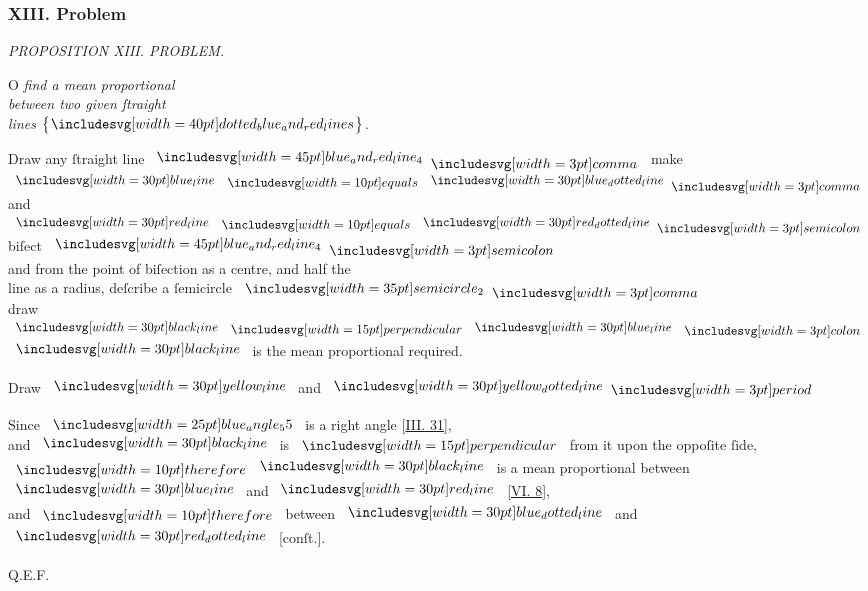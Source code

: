 \documentclass[11pt,preview]{standalone}
\begin{document}
\subsubsection{XIII. Problem}

\begin{minipage}[t]{0.54\textwidth}
    \begin{center}
        \textit{PROPOSITION XIII. PROBLEM.}\label{book6pr13} \\
    \end{center}

    \hfill

    \begin{center}
        \raggedright \lettrine[lines=3, loversize=1, nindent=0pt]{}{}O \textit{find a mean proportional\\ between two given ſtraight\\ lines} $\left\{\hspace{-1ex}\img[0][0][40]{dotted_blue_and_red_lines}\hspace{-1ex}\right\}$.
    \end{center}
\end{minipage}%
\hfill
\begin{minipage}[t]{0.43\textwidth}
    \vspace{20pt}
    
\end{minipage}%

\hfill

\hfill

\begin{center}
    Draw any ſtraight line $\bimg{blue_and_red_line_4} \bcomma$ make $\blueline \bequals \dottedblueline \bcomma$\\
    and $\redline \bequals \dottedredline \bsemicolon$ biſect $\bimg{blue_and_red_line_4} \bsemicolon$\\
    and from the point of biſection as a centre, and half the\\
    line as a radius, deſcribe a ſemicircle $\img[0][0][35]{semicircle_2} \bcomma$\\
    draw $\blackline \bperp \blueline \bcolon$\\
    $\blackline$ is the mean proportional required.
\end{center}

\begin{center}
    Draw $\yellowline$ and $\dottedyellowline \bperiod$
\end{center}

\begin{center}
    Since $\img{blue_angle_55}$ is a right angle [\hyperref[book3pr31]{\textsc{III.} 31}],\\
    and $\blackline$ is $\bperp$ from it upon the oppoſite ſide,\\
    $\btherefore \blackline$ is a mean proportional between\\
    $\blueline$ and $\redline$ [\hyperref[book6pr8]{\textsc{VI.} 8}],\\
    and $\btherefore$ between $\dottedblueline$ and $\dottedredline$ [conſt.].
\end{center}

\hfill

\hfill Q.E.F.
\end{document}
